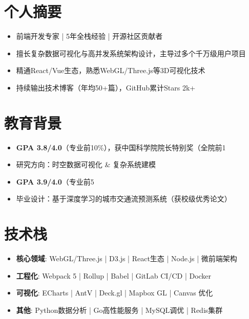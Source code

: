 \documentclass[11pt,a4paper]{resume}
\begin{document}

\vspace{0.2cm}


\section{\faUser 个人摘要}
\begin{itemize}[leftmargin=*]
  \item 前端开发专家 | 5年全栈经验 | 开源社区贡献者
  \item 擅长复杂数据可视化与高并发系统架构设计，主导过多个千万级用户项目
  \item 精通React/Vue生态，熟悉WebGL/Three.js等3D可视化技术
  \item 持续输出技术博客（年均50+篇），GitHub累计Stars 2k+
\end{itemize}

\section{ 教育背景}
\begin{itemize}[leftmargin=*]
  \item \textbf{GPA 3.8/4.0}（专业前10\%），获中国科学院院长特别奖（全院前1%
  \item 研究方向：时空数据可视化 \& 复杂系统建模
\end{itemize}

\begin{itemize}[leftmargin=*]
  \item \textbf{GPA 3.9/4.0}（专业前5%
  \item 毕业设计：基于深度学习的城市交通流预测系统（获校级优秀论文）
\end{itemize}

\section{ 技术栈}
\begin{itemize}[leftmargin=*]
  \item \textbf{核心领域}: WebGL/Three.js | D3.js | React生态 | Node.js | 微前端架构
  \item \textbf{工程化}: Webpack 5 | Rollup | Babel | GitLab CI/CD | Docker
  \item \textbf{可视化}: ECharts | AntV | Deck.gl | Mapbox GL | Canvas 优化
  \item \textbf{其他}: Python数据分析 | Go高性能服务 | MySQL调优 | Redis集群
\end{itemize}
\end{document}
